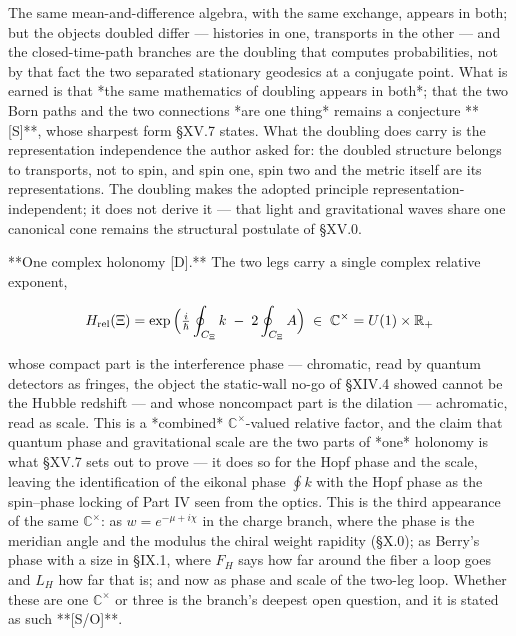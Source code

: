 The same mean-and-difference algebra, with the same exchange, appears in both; but the objects doubled differ — histories in one, transports in the other — and the closed-time-path branches are the doubling that computes probabilities, not by that fact the two separated stationary geodesics at a conjugate point. What is earned is that *the same mathematics of doubling appears in both*; that the two Born paths and the two connections *are one thing* remains a conjecture **[S]**, whose sharpest form §XV.7 states. What the doubling does carry is the representation independence the author asked for: the doubled structure belongs to transports, not to spin, and spin one, spin two and the metric itself are its representations. The doubling makes the adopted principle representation-independent; it does not derive it — that light and gravitational waves share one canonical cone remains the structural postulate of §XV.0.

**One complex holonomy [D].** The two legs carry a single complex relative exponent,

$$H_{\rm rel}(\Xi) = \exp\Big(\tfrac{i}{\hbar}\oint_{C_\Xi}k\;-\;2\oint_{C_\Xi}A\Big)\;\in\;\mathbb C^\times = U(1)\times\mathbb R_+$$

whose compact part is the interference phase — chromatic, read by quantum detectors as fringes, the object the static-wall no-go of §XIV.4 showed cannot be the Hubble redshift — and whose noncompact part is the dilation — achromatic, read as scale. This is a *combined* $\mathbb C^\times$-valued relative factor, and the claim that quantum phase and gravitational scale are the two parts of *one* holonomy is what §XV.7 sets out to prove — it does so for the Hopf phase and the scale, leaving the identification of the eikonal phase $\oint k$ with the Hopf phase as the spin–phase locking of Part IV seen from the optics. This is the third appearance of the same $\mathbb C^\times$: as $w = e^{-\mu+i\chi}$ in the charge branch, where the phase is the meridian angle and the modulus the chiral weight rapidity (§X.0); as Berry's phase with a size in §IX.1, where $F_H$ says how far around the fiber a loop goes and $L_H$ how far that is; and now as phase and scale of the two-leg loop. Whether these are one $\mathbb C^\times$ or three is the branch's deepest open question, and it is stated as such **[S/O]**.

